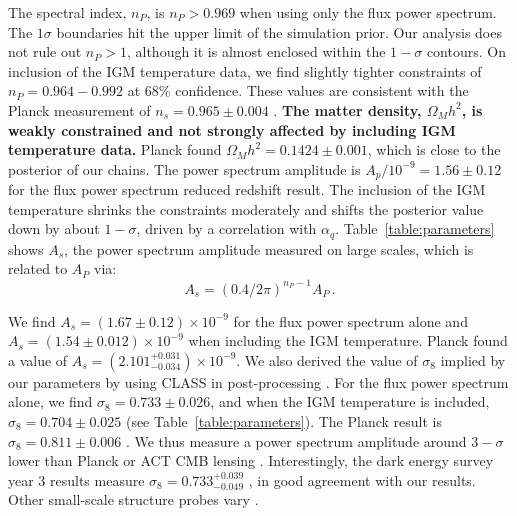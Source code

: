 The spectral index, $n_P$, is $n_P > 0.969$ when using only the flux power spectrum. The $1\sigma$ boundaries hit the upper limit of the simulation prior. Our analysis does not rule out $n_P > 1$, although it is almost enclosed within the $1-\sigma$ contours. On inclusion of the IGM temperature data, we find slightly tighter constraints of $n_P = 0.964 - 0.992$ at 68\% confidence.
These values are consistent with the Planck measurement of $n_s=0.965 \pm 0.004$ \cite{2020A&A...641A...6P}.
\textbf{The matter density, $\Omega_M h^2$, is weakly constrained and not strongly affected by including IGM temperature data.}
Planck found $\Omega_M h^2 = 0.1424\pm0.001$, which is close to the posterior of our chains.
The power spectrum amplitude is $A_p/10^{-9} = 1.56 \pm 0.12$ for the flux power spectrum reduced redshift result.
The inclusion of the IGM temperature shrinks the constraints moderately and shifts the posterior value down by about $1-\sigma$, driven by a correlation with $\alpha_q$.
Table~\ref{table:parameters} shows $A_s$, the power spectrum amplitude measured on large scales, which is related to $A_P$ via:
\begin{equation}
    A_s = \left(0.4/2\pi\right)^{n_P-1} A_P\,.
\end{equation}

We find $A_s = (1.67 \pm 0.12) \times10^{-9}$ for the flux power spectrum alone and $A_s = (1.54 \pm 0.012 )\times10^{-9}$ when including the IGM temperature.
Planck \cite{2020A&A...641A...6P} found a value of $A_s = \left(2.101^{+0.031}_{-0.034}\right)\times10^{-9}$. 
We also derived the value of $\sigma_8$ implied by our parameters by using CLASS in post-processing \cite{2011arXiv1104.2932L}. 
For the flux power spectrum alone, we find $\sigma_8 = 0.733 \pm 0.026$, and when the IGM temperature is included, $\sigma_8 = 0.704 \pm 0.025$ (see Table~\ref{table:parameters}).
The Planck result is $\sigma_8 = 0.811 \pm 0.006$ \cite{2020A&A...641A...6P}.
We thus measure a power spectrum amplitude around $3-\sigma$ lower than Planck or ACT CMB lensing \cite{2023arXiv230405202Q}.
Interestingly, the dark energy survey year 3 results measure $\sigma_8 = 0.733^{+0.039}_{-0.049}$ \cite{2022PhRvD.105b3520A}, in good agreement with our results. Other small-scale structure probes vary \cite[e.g.~][]{2020JCAP...05..042I, 2022JHEAp..34...49A, 2023JCAP...04..057Y}. 

